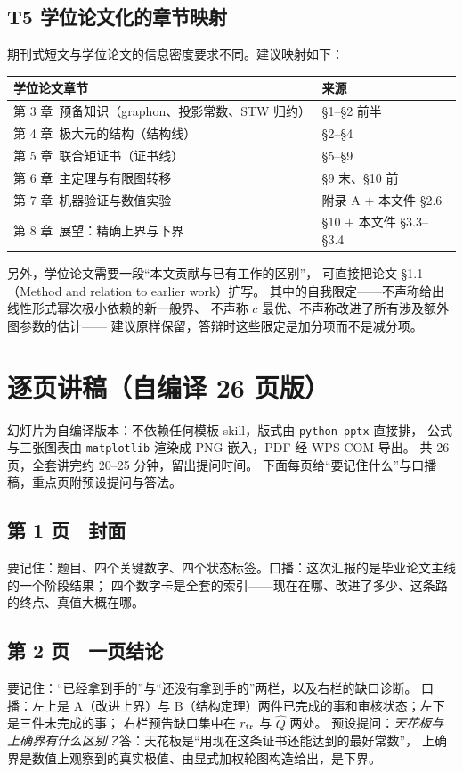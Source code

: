 \documentclass[UTF8,11pt]{ctexart}
\newcommand{\file}[1]{\texttt{#1}}
\begin{document}
\subsection{T5 学位论文化的章节映射}

期刊式短文与学位论文的信息密度要求不同。建议映射如下：
\begin{center}
\small
\begin{tabular}{ll}
\toprule
学位论文章节 & 来源 \\
\midrule
第 3 章\ 预备知识（graphon、投影常数、STW 归约） & \S1--\S2 前半 \\
第 4 章\ 极大元的结构（结构线） & \S2--\S4 \\
第 5 章\ 联合矩证书（证书线） & \S5--\S9 \\
第 6 章\ 主定理与有限图转移 & \S9 末、\S10 前 \\
第 7 章\ 机器验证与数值实验 & 附录 A $+$ 本文件 \S2.6 \\
第 8 章\ 展望：精确上界与下界 & \S10 $+$ 本文件 \S3.3--\S3.4 \\
\bottomrule
\end{tabular}
\end{center}
另外，学位论文需要一段``本文贡献与已有工作的区别''，
可直接把论文 \S1.1（Method and relation to earlier work）扩写。
其中的自我限定——不声称给出线性形式幂次极小依赖的新一般界、
不声称 $c$ 最优、不声称改进了所有涉及额外图参数的估计——
建议原样保留，答辩时这些限定是加分项而不是减分项。

\section{逐页讲稿（自编译 26 页版）}

幻灯片为自编译版本：不依赖任何模板 skill，版式由 \file{python-pptx} 直接排，
公式与三张图表由 \file{matplotlib} 渲染成 PNG 嵌入，PDF 经 WPS COM 导出。
共 26 页，全套讲完约 20--25 分钟，留出提问时间。
下面每页给``要记住什么''与口播稿，重点页附预设提问与答法。

\subsection*{第 1 页　封面}
要记住：题目、四个关键数字、四个状态标签。口播：这次汇报的是毕业论文主线的一个阶段结果；
四个数字卡是全套的索引——现在在哪、改进了多少、这条路的终点、真值大概在哪。

\subsection*{第 2 页　一页结论}
要记住：``已经拿到手的''与``还没有拿到手的''两栏，以及右栏的缺口诊断。
口播：左上是 A（改进上界）与 B（结构定理）两件已完成的事和审核状态；左下是三件未完成的事；
右栏预告缺口集中在 $r_{\rm tr}$ 与 $\widehat Q$ 两处。
预设提问：\emph{天花板与上确界有什么区别？}答：天花板是``用现在这条证书还能达到的最好常数''，
上确界是数值上观察到的真实极值、由显式加权轮图构造给出，是下界。
\end{document}
